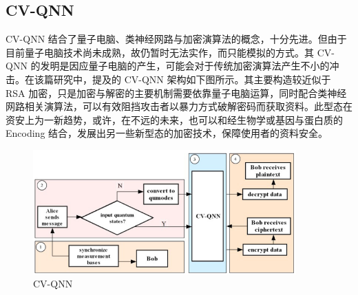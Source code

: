 \subsection{CV-QNN}

CV-QNN 结合了量子电脑、类神经网路与加密演算法的概念，十分先进。但由于目前量子电脑技术尚未成熟，故仍暂时无法实作，而只能模拟的方式。其 CV-QNN 的发明是因应量子电脑的产生，可能会对于传统加密演算法产生不小的冲击。在该篇研究中，提及的 CV-QNN 架构如下图所示。其主要构造较近似于 RSA 加密，只是加密与解密的主要机制需要依靠量子电脑运算，同时配合类神经网路相关演算法，可以有效阻挡攻击者以暴力方式破解密码而获取资料。此型态在资安上为一新趋势，或许，在不远的未来，也可以和经生物学或基因与蛋白质的 Encoding 结合，发展出另一些新型态的加密技术，保障使用者的资料安全。

\begin{figure}[htb]
\centering 
\includegraphics[width=0.90\textwidth]{img/ch3m7.png} 
\caption{CV-QNN}
\label{Test}
\end{figure}